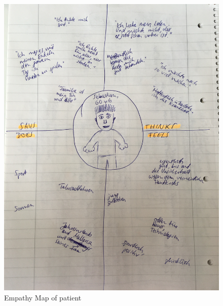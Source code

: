 \begin{figure}[h!]
	\centering
	\includegraphics[width=1\textwidth]{images/empathymap_patient.jpg}
	\caption{Empathy Map of patient}
	\label{patient}
\end{figure}

